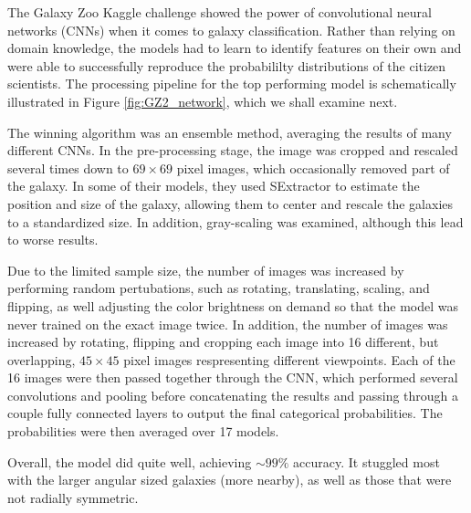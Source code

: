 \documentclass{article}
\begin{document}
The Galaxy Zoo Kaggle challenge showed the power of convolutional neural networks (CNNs) when it comes to galaxy classification. Rather than relying on domain knowledge, the models had to learn to identify features on their own and were able to successfully reproduce the probabililty distributions of the citizen scientists. The processing pipeline for the top performing model \citep{2015MNRAS.450.1441D} is schematically illustrated in Figure \ref{fig:GZ2_network}, which we shall examine next. 

The winning algorithm was an ensemble method, averaging the results of many different CNNs. In the pre-processing stage, the image was cropped and rescaled several times down to $69 \times 69$ pixel images, which occasionally removed part of the galaxy. In some of their models, they used SExtractor to estimate the position and size of the galaxy, allowing them to center and rescale the galaxies to a standardized size. In addition, gray-scaling was examined, although this lead to worse results.

Due to the limited sample size, the number of images was increased by performing random pertubations, such as rotating, translating, scaling, and flipping, as well adjusting the color brightness on demand so that the model was never trained on the exact image twice. In addition, the number of images was increased by rotating, flipping and cropping each image into 16 different, but overlapping, $45 \times 45$ pixel images respresenting different viewpoints. Each of the 16 images were then passed together through the CNN, which performed several convolutions and pooling before concatenating the results and passing through a couple fully connected layers to output the final categorical probabilities. The probabilities were then averaged over 17 models.

Overall, the model did quite well, achieving $\sim 99\%$ accuracy. It stuggled most with the larger angular sized galaxies (more nearby), as well as those that were not radially symmetric.
\end{document}
